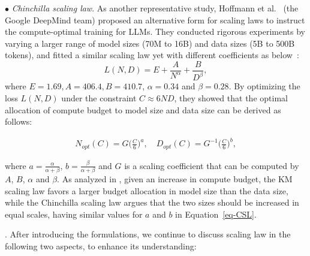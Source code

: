 $\bullet$ \emph{Chinchilla scaling law}. As another representative study,  Hoffmann et al.~\cite{Hoffmann-arxiv-2022-Training} (the Google DeepMind team) 
proposed an alternative form for scaling laws to instruct the compute-optimal training for LLMs. They conducted rigorous  experiments by varying a larger range of model sizes (70M to 16B) and data sizes (5B to 500B tokens), and fitted a similar scaling law yet with different coefficients  as below~\cite{Hoffmann-arxiv-2022-Training}:
 \begin{equation}
L(N, D) = E + \frac{A}{N^\alpha} + \frac{B}{D^{\beta}},
\end{equation}
where $E = 1.69, A = 406.4, B = 410.7$, $\alpha=0.34$ and $\beta=0.28$. By optimizing the loss $L(N, D)$ under the constraint $C\approx 6ND$, they showed that  the optimal  allocation of compute budget to model size and data size can be  derived as follows: 

\begin{small}
\begin{eqnarray}\label{eq-CSL}
N_{opt}(C)=G \bigg(\frac{C}{6}\bigg)^a, \text{~~~}
D_{opt}(C)=G^{-1} \bigg(\frac{C}{6}\bigg)^b, 
\end{eqnarray}\nonumber
\end{small}


\noindent where $a=\frac{\alpha}{\alpha+\beta}$,  $b=\frac{\beta}{\alpha+\beta}$ and $G$ is a scaling coefficient that can be computed by $A$, $B$, $\alpha$ and $\beta$. As analyzed in \cite{Hoffmann-arxiv-2022-Training}, given an increase in compute budget, the KM scaling law favors a larger budget allocation in model size than the data size, while the Chinchilla scaling law argues that the two sizes should be increased in equal scales, \ie having similar values for $a$ and $b$ in Equation~\eqref{eq-CSL}. 

. After introducing the formulations, we continue to discuss scaling law in the following two aspects, to enhance its understanding: 

